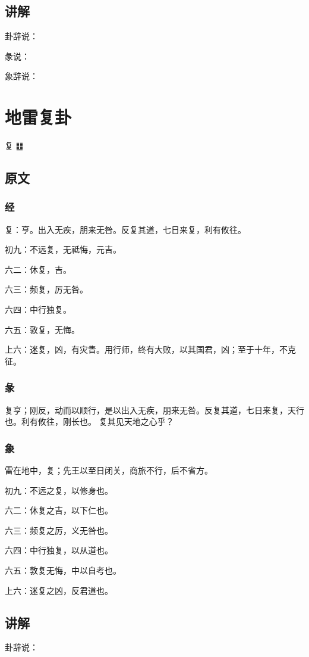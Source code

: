 \documentclass[12pt,oneside]{book}
\begin{document}
\section{讲解}
卦辞说：

彖说：

象辞说：

\chapter{地雷复卦}
复 {\Large ䷗}

\section{原文}
\subsection{经}
复：亨。出入无疾，朋来无咎。反复其道，七日来复，利有攸往。

初九：不远复，无祗悔，元吉。

六二：休复，吉。

六三：频复，厉无咎。

六四：中行独复。

六五：敦复，无悔。

上六：迷复，凶，有灾眚。用行师，终有大败，以其国君，凶；至于十年，不克征。

\subsection{彖}
复亨；刚反，动而以顺行，是以出入无疾，朋来无咎。反复其道，七日来复，天行也。利有攸往，刚长也。 复其见天地之心乎？

\subsection{象}
雷在地中，复；先王以至日闭关，商旅不行，后不省方。

初九：不远之复，以修身也。

六二：休复之吉，以下仁也。

六三：频复之厉，义无咎也。

六四：中行独复，以从道也。

六五：敦复无悔，中以自考也。

上六：迷复之凶，反君道也。

\section{讲解}
卦辞说：
\end{document}
